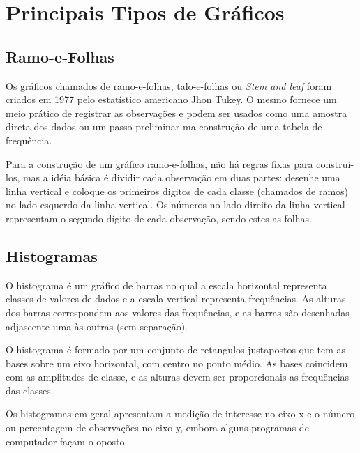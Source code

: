 \newpage
\section{Principais Tipos de Gráficos}

\subsection{Ramo-e-Folhas}

Os gráficos chamados de ramo-e-folhas, talo-e-folhas ou \textit{Stem and leaf} foram criados em 1977 pelo estatístico americano Jhon Tukey. O mesmo fornece um meio prático de registrar as observações e podem ser usados como uma amostra direta dos dados ou um passo preliminar ma construção de uma tabela de frequência.\vst






Para a construção de um gráfico ramo-e-folhas, não há regras fixas para construi-los, mas a idéia básica é dividir cada observação em duas partes: desenhe uma linha vertical e coloque os primeiros digitos de cada classe (chamados de ramos) no lado esquerdo da linha vertical. Os números no lado direito da linha vertical representam o segundo dígito de cada observação, sendo estes as folhas.





\newpage
\subsection{Histogramas}

\inic O histograma é um gráfico de barras no qual a escala horizontal representa classes de valores de dados e a escala vertical representa frequências. As alturas dos barras correspondem aos valores das frequências, e as barras são desenhadas adjascente uma às outras (sem separação).
 \vskip0.3cm
 
\inic O histograma é formado por um conjunto de retangulos justapostos
que tem as bases sobre um eixo horizontal, com centro no ponto
médio. As bases coincidem com as amplitudes de classe, e as
alturas devem ser proporcionais as frequências das
classes.
\vskip0.3cm 
 

\inic Os histogramas em geral apresentam a medição de interesse no eixo
x e o número ou percentagem de observações no eixo y, embora
alguns programas de computador façam o oposto. 
\vskip0.3cm

